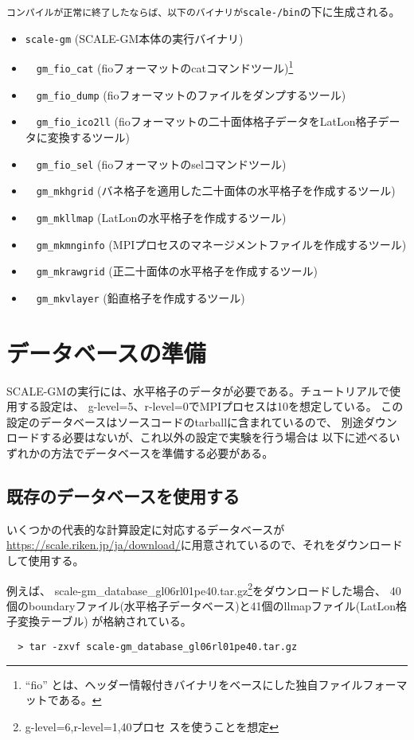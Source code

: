 \verb|コンパイルが正常に終了したならば、以下のバイナリが|\texttt{scale-{\version}/bin}の下に生成される。
 \begin{itemize}
   \item \verb|scale-gm| (SCALE-GM本体の実行バイナリ)
   \item　\verb|gm_fio_cat| (fioフォーマットのcatコマンドツール)\footnote{``fio'' とは、ヘッダー情報付きバイナリをベースにした独自ファイルフォーマットである。}
   \item　\verb|gm_fio_dump| (fioフォーマットのファイルをダンプするツール)
   \item　\verb|gm_fio_ico2ll| (fioフォーマットの二十面体格子データをLatLon格子データに変換するツール)
   \item　\verb|gm_fio_sel| (fioフォーマットのselコマンドツール)
   \item　\verb|gm_mkhgrid| (バネ格子を適用した二十面体の水平格子を作成するツール)
   \item　\verb|gm_mkllmap| (LatLonの水平格子を作成するツール)
   \item　\verb|gm_mkmnginfo| (MPIプロセスのマネージメントファイルを作成するツール)
   \item　\verb|gm_mkrawgrid| (正二十面体の水平格子を作成するツール)
   \item　\verb|gm_mkvlayer| (鉛直格子を作成するツール)
 \end{itemize}


\section{データベースの準備}

SCALE-GMの実行には、水平格子のデータが必要である。チュートリアルで使用する設定は、
g-level=5、r-level=0でMPIプロセスは10を想定している。
この設定のデータベースはソースコードのtarballに含まれているので、
別途ダウンロードする必要はないが、これ以外の設定で実験を行う場合は
以下に述べるいずれかの方法でデータベースを準備する必要がある。
\subsection{既存のデータベースを使用する}
いくつかの代表的な計算設定に対応するデータベースが\noindent \url{https://scale.riken.jp/ja/download/}に用意されているので、それをダウンロードして使用する。

例えば、
scale-gm\_database\_gl06rl01pe40.tar.gz\footnote{g-level=6,r-level=1,40プロセ
  スを使うことを想定}をダウンロードした場合、
40個のboundaryファイル(水平格子データベース)と41個のllmapファイル(LatLon格子変換テーブル)
が格納されている。
\begin{verbatim}
  > tar -zxvf scale-gm_database_gl06rl01pe40.tar.gz
\end{verbatim}

